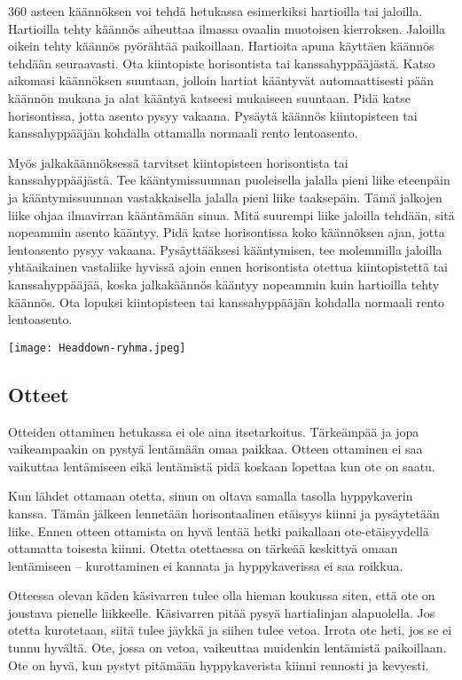 360 asteen käännöksen voi tehdä hetukassa esimerkiksi hartioilla tai jaloilla. Hartioilla tehty käännös aiheuttaa ilmassa ovaalin muotoisen kierroksen. Jaloilla oikein tehty käännös pyörähtää paikoillaan. Hartioita apuna käyttäen käännös tehdään seuraavasti. Ota kiintopiste horisontista tai kanssahyppääjästä. Katso aikomasi käännöksen suuntaan, jolloin hartiat kääntyvät automaattisesti pään käännön mukana ja alat kääntyä katseesi mukaiseen suuntaan. Pidä katse horisontissa, jotta asento pysyy vakaana. Pysäytä käännös kiintopisteen tai kanssahyppääjän kohdalla ottamalla normaali rento lentoasento. 


Myös jalkakäännöksessä tarvitset kiintopisteen horisontista tai kanssahyppääjästä. Tee kääntymissuunnan puoleisella jalalla pieni liike eteenpäin ja kääntymissuunnan vastakkaisella jalalla pieni liike taaksepäin. Tämä jalkojen liike ohjaa ilmavirran kääntämään sinua. Mitä suurempi liike jaloilla tehdään, sitä nopeammin asento kääntyy. Pidä katse horisontissa koko käännöksen ajan, jotta lentoasento pysyy vakaana. Pysäyttääksesi kääntymisen, tee molemmilla jaloilla yhtäaikainen vastaliike hyvissä ajoin ennen horisontista otettua kiintopistettä tai kanssahyppääjää, koska jalkakäännös kääntyy nopeammin kuin hartioilla tehty käännös. Ota lopuksi kiintopisteen tai kanssahyppääjän kohdalla normaali rento lentoasento. 


\begin{figure*}[]\centering\texttt{[image: Headdown-ryhma.jpeg]}\end{figure*} 

\subsection{ Otteet }
\label{freefly-lentoasennot-otteet}


Otteiden ottaminen hetukassa ei ole aina itsetarkoitus. Tärkeämpää ja jopa vaikeampaakin on pystyä lentämään omaa paikkaa. Otteen ottaminen ei saa vaikuttaa lentämiseen eikä lentämistä pidä koskaan lopettaa kun ote on saatu. 


Kun lähdet ottamaan otetta, sinun on oltava samalla tasolla hyppykaverin kanssa. Tämän jälkeen lennetään horisontaalinen etäisyys kiinni ja pysäytetään liike. Ennen otteen ottamista on hyvä lentää hetki paikallaan ote-etäisyydellä ottamatta toisesta kiinni. Otetta otettaessa on tärkeää keskittyä omaan lentämiseen – kurottaminen ei kannata ja hyppykaverissa ei saa roikkua. 


Otteessa olevan käden käsivarren tulee olla hieman koukussa siten, että ote on joustava pienelle liikkeelle. Käsivarren pitää pysyä hartialinjan alapuolella. Jos otetta kurotetaan, siitä tulee jäykkä ja siihen tulee vetoa. Irrota ote heti, jos se ei tunnu hyvältä. Ote, jossa on vetoa, vaikeuttaa muidenkin lentämistä paikoillaan. Ote on hyvä, kun pystyt pitämään hyppykaverista kiinni rennosti ja kevyesti. 

